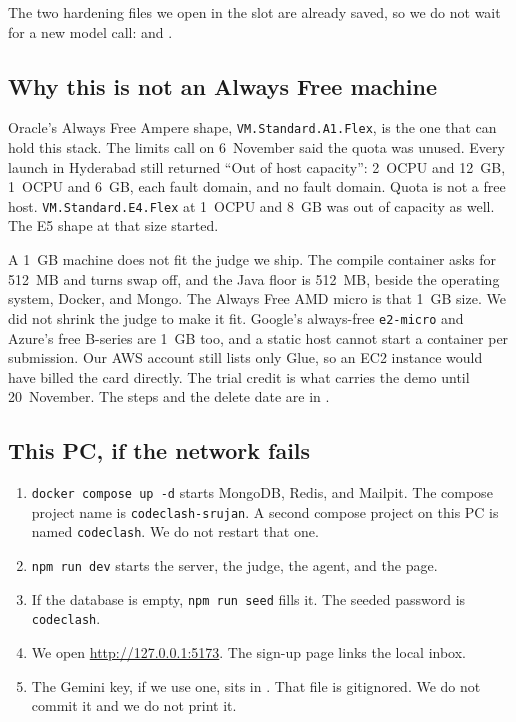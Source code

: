\documentclass[11pt,a4paper]{article}
\begin{document}
The two hardening files we open in the slot are already saved, so we do not wait for a new model call:  and .

\subsection{Why this is not an Always Free machine}

Oracle's Always Free Ampere shape, \texttt{VM.Standard.A1.Flex}, is the one that can hold this stack. The limits call on 6~November said the quota was unused. Every launch in Hyderabad still returned ``Out of host capacity'': 2~OCPU and 12~GB, 1~OCPU and 6~GB, each fault domain, and no fault domain. Quota is not a free host. \texttt{VM.Standard.E4.Flex} at 1~OCPU and 8~GB was out of capacity as well. The E5 shape at that size started.

A 1~GB machine does not fit the judge we ship. The compile container asks for 512~MB and turns swap off, and the Java floor is 512~MB, beside the operating system, Docker, and Mongo. The Always Free AMD micro is that 1~GB size. We did not shrink the judge to make it fit. Google's always-free \texttt{e2-micro} and Azure's free B-series are 1~GB too, and a static host cannot start a container per submission. Our AWS account still lists only Glue, so an EC2 instance would have billed the card directly. The trial credit is what carries the demo until 20~November. The steps and the delete date are in .

\subsection{This PC, if the network fails}

\begin{enumerate}
\item \texttt{docker compose up -d} starts MongoDB, Redis, and Mailpit. The compose project name is \texttt{codeclash-srujan}. A second compose project on this PC is named \texttt{codeclash}. We do not restart that one.
\item \texttt{npm run dev} starts the server, the judge, the agent, and the page.
\item If the database is empty, \texttt{npm run seed} fills it. The seeded password is \texttt{codeclash}.
\item We open \url{http://127.0.0.1:5173}. The sign-up page links the local inbox.
\item The Gemini key, if we use one, sits in . That file is gitignored. We do not commit it and we do not print it.
\end{enumerate}
\end{document}
